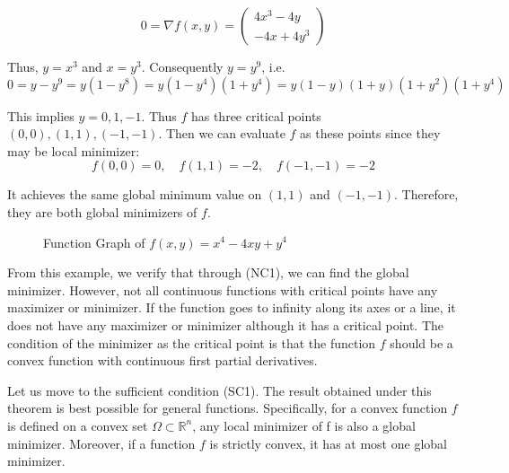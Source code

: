$$
0=\nabla f(x, y)=\left(\begin{array}{c}4 x^{3}-4 y \\ -4 x+4 y^{3}\end{array}\right)
$$
\par Thus, $y = x^3$ and $x = y^3$. Consequently $y = y^9$, i.e.
$$
0=y-y^{9}=y\left(1-y^{8}\right)=y\left(1-y^{4}\right)\left(1+y^{4}\right)=y(1-y)(1+y)\left(1+y^{2}\right)\left(1+y^{4}\right)
$$
\par This implies $y = 0, 1, -1$. Thus $f$ has three critical points $(0,0), (1,1), (-1,-1)$. Then we can evaluate $f$ as these points since they may be local minimizer:
$$
f(0,0)=0, \quad f(1,1)=-2, \quad f(-1,-1)=-2
$$
\par It achieves the same global minimum value on $(1, 1)$ and $(-1, -1)$. Therefore, they are both global minimizers of $f$. 
\begin{figure}[t]
\label{fig:unconseg}
\centering
{}
\caption{Function Graph of $f(x, y)=x^{4}-4 x y+y^{4}$}
\end{figure}
\par From this example, we verify that through (NC1), we can find the global minimizer. However, not all continuous functions with critical points have any maximizer or minimizer. If the function goes to infinity along its axes or a line, it does not have any maximizer or minimizer although it has a critical point. The condition of the minimizer as the critical point is that the function $f$ should be a convex function with continuous first partial derivatives.
\par Let us move to the sufficient condition (SC1). The result obtained under this theorem is best possible for general functions. Specifically, for a convex function $f$ is defined on a convex set $\Omega \subset \mathbb{R}^n$, any local minimizer of f is also a global minimizer. Moreover, if a function $f$ is strictly convex, it has at most one global minimizer. 

